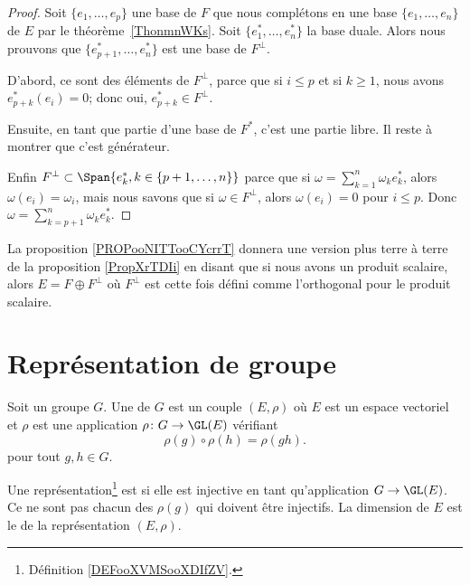 \begin{proof}
	Soit \( \{ e_1,\ldots, e_p \}\) une base de \( F\) que nous complétons en une base \( \{ e_1,\ldots, e_n \}\) de \( E\) par le théorème~\ref{ThonmnWKs}. Soit \( \{ e_1^*,\ldots, e^*_n \}\) la base duale. Alors nous prouvons que \( \{ e^*_{p+1},\ldots, e_n^* \}\) est une base de \( F^{\perp}\).

	D'abord, ce sont des éléments de \( F^{\perp}\), parce que si \( i\leq p\) et si \( k\geq 1\), nous avons \( e^*_{p+k}(e_i)=0\); donc oui, \( e^*_{p+k}\in F^{\perp}\).

	Ensuite, en tant que partie d'une base de \( F^*\), c'est une partie libre. Il reste à montrer que c'est générateur.


	Enfin \( F^{\perp}\subset\Span\{ e_{k}^*, k \in \{p+1, \dots, n\}\}\) parce que si \( \omega=\sum_{k=1}^n\omega_ke_k^*\), alors \( \omega(e_i)=\omega_i\), mais nous savons que si \( \omega\in F^{\perp}\), alors \( \omega(e_i)=0\) pour \( i\leq p\). Donc \( \omega=\sum_{k=p+1}^n\omega_ke^*_k\).
\end{proof}

La proposition \ref{PROPooNITTooCYcrrT} donnera une version plus terre à terre de la proposition \ref{PropXrTDIi} en disant que si nous avons un produit scalaire, alors \( E=F\oplus F^{\perp}\) où \( F^{\perp}\) est cette fois défini comme l'orthogonal pour le produit scalaire.

\section{Représentation de groupe}

\begin{definition}[Représentation]      \label{DEFooXVMSooXDIfZV}
	Soit un groupe \( G\). Une  de \( G\) est un couple \( (E,\rho)\) où \( E\) est un espace vectoriel et \( \rho\) est une application \( \rho\colon G\to \GL(E)\) vérifiant
	\begin{equation}
		\rho(g)\circ\rho(h)=\rho(gh).
	\end{equation}
	pour tout \( g,h\in G\).
\end{definition}

\begin{definition}
	Une représentation\footnote{Définition \ref{DEFooXVMSooXDIfZV}.} est  si elle est injective en tant qu'application \( G\to \GL(E)\). Ce ne sont pas chacun des \( \rho(g)\) qui doivent être injectifs. La dimension de \( E\) est le  de la représentation \( (E,\rho)\).
\end{definition}

